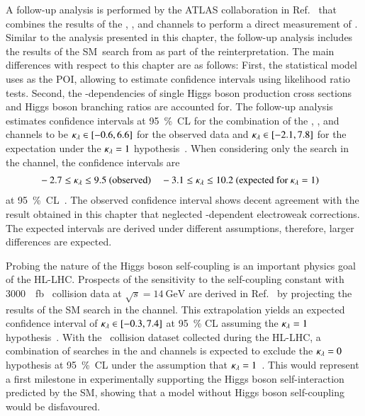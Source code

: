 A follow-up analysis is performed by the ATLAS collaboration in
Ref.~\cite{HDBS-2022-03} that combines the results of the \bbbb, \bbtautau, and
\bbyy channels to perform a direct measurement of \klambda.  Similar to the
analysis presented in this chapter, the follow-up analysis includes the results
of the SM~\HH search from  as part of the
reinterpretation. The main differences with respect to this chapter are as
follows: First, the statistical model uses \klambda as the POI, allowing to
estimate \klambda confidence intervals using likelihood ratio tests. Second, the
\klambda-dependencies of single Higgs boson production cross sections and Higgs
boson branching ratios are accounted for.
The follow-up analysis estimates \klambda confidence intervals at
\SI{95}{\percent}~CL for the combination of the \bbbb, \bbtautau, and \bbyy
channels to be $\kappa_{\lambda} \in [-0.6, 6.6]$ for the observed data and
$\kappa_{\lambda} \in [-2.1, 7.8]$ for the expectation under the $\kappa_{\lambda} = 1$
hypothesis~\cite{HDBS-2022-03}. When considering only the search in the
\bbtautau channel, the \klambda confidence intervals are
\begin{align*}
  &-2.7 \leq \kappa_{\lambda} \leq 9.5 \text{ (observed)}
  &&-3.1 \leq \kappa_{\lambda} \leq 10.2 \text{ (expected for $\kappa_{\lambda} = 1$)}
\end{align*}
at \SI{95}{\percent}~CL~\cite{hepdata.h_hh_comb}.
The observed \klambda confidence interval shows decent agreement with the result
obtained in this chapter that neglected \klambda-dependent electroweak
corrections. The expected \klambda intervals are derived under different
assumptions, therefore, larger differences are expected.

Probing the nature of the Higgs boson self-coupling is an important physics goal
of the HL-LHC. Prospects of the sensitivity to the self-coupling constant with
\SI{3000}{\per\femto\barn} \pp~collision data at $\sqrt{s} = \SI{14}{\GeV}$ are
derived in Ref.~\cite{ATL-PHYS-PUB-2021-044} by projecting the results of the SM
\HH search in the \bbtautau channel. This extrapolation yields an expected
confidence interval of $\kappa_{\lambda} \in [-0.3, 7.4]$ at \SI{95}{\percent} CL
assuming the $\kappa_{\lambda} = 1$ hypothesis~\cite{ATL-PHYS-PUB-2021-044}. With the
\pp~collision dataset collected during the HL-LHC, a combination of searches in
the \bbtautau and \bbyy channels is expected to exclude the $\kappa_{\lambda} = 0$
hypothesis at \SI{95}{\percent}~CL under the assumption that
$\kappa_{\lambda} = 1$~\cite{ATL-PHYS-PUB-2022-005}. This would represent a first
milestone in experimentally supporting the Higgs boson self-interaction
predicted by the SM, showing that a model without Higgs boson self-coupling
would be disfavoured.

